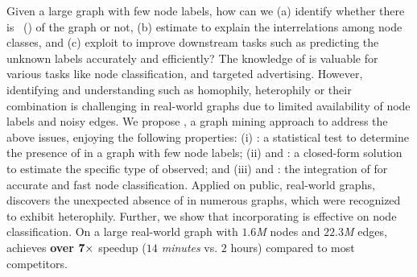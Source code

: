 Given a large graph with few node labels, how can we 
(a) identify whether there is \neteffect~(\nef) of the graph or not, 
(b) estimate \nef to explain the interrelations among node classes, and 
(c) exploit \nef to improve downstream tasks such as predicting the unknown labels accurately and efficiently? 
The knowledge of \nef is valuable for various tasks like node classification, and targeted advertising. 
However, identifying and understanding \nef such as homophily, heterophily or their combination is challenging in real-world graphs due to limited availability of node labels and noisy edges. 
We propose \method, a graph mining approach to address the above issues,
enjoying the following properties:
(i) \theory: a statistical test to determine the presence of \nef in a graph with few node labels; 
(ii) \general and \explain: a closed-form solution to estimate the specific type of \nef observed; and 
(iii) \accurate and \scale: the integration of \nef for accurate and fast node classification.
Applied on public, real-world graphs, \method discovers the unexpected absence of \nef in numerous graphs, which were recognized to exhibit heterophily. 
Further, we show that incorporating \nef is effective on node classification.
On a large real-world graph with {\em $1.6$M} nodes and {\em$22.3$M} edges, \method achieves {\bf over $\bf 7\times$} speedup ({\em $14$ minutes} vs. $2$ hours) compared to most competitors.


